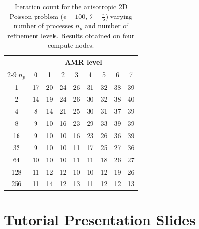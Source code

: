 \documentclass[a4paper,12pt]{article}
\begin{document}
\begin{table}[htbp]
  \centering
  \footnotesize
  \begin{tabular}{ccccccccc}
    \toprule
          & \multicolumn{8}{c}{AMR level}                                    \\
    \cmidrule{2-9}
    $n_p$ & 0                             & 1  & 2  & 3  & 4  & 5  & 6  & 7  \\
    \midrule
    1     & 17                            & 20 & 24 & 26 & 31 & 32 & 38 & 39 \\
    2     & 14                            & 19 & 24 & 26 & 30 & 32 & 38 & 40 \\
    4     & 8                             & 14 & 21 & 25 & 30 & 31 & 37 & 39 \\
    8     & 9                             & 10 & 16 & 23 & 29 & 33 & 39 & 39 \\
    16    & 9                             & 10 & 10 & 16 & 23 & 26 & 36 & 39 \\
    32    & 9                             & 10 & 10 & 11 & 17 & 25 & 27 & 36 \\
    64    & 10                            & 10 & 10 & 11 & 11 & 18 & 26 & 27 \\
    128   & 11                            & 12 & 12 & 10 & 10 & 12 & 19 & 26 \\
    256   & 11                            & 14 & 12 & 13 & 11 & 12 & 12 & 13 \\
    \bottomrule
  \end{tabular}
  \caption{Iteration count for the anisotropic 2D Poisson problem ($\epsilon = 100$, $\theta = \frac{\pi}{6}$) varying number of processes $n_p$ and number of refinement levels. Results obtained on four compute nodes. \label{tab:anisopoisson2D}}

\end{table}


\appendix
\section*{Tutorial Presentation Slides}
\end{document}
